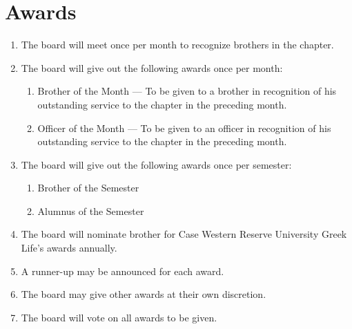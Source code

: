 \section{Awards}
	\begin{enumerate}
		\item The board will meet once per month to recognize brothers in the chapter.
		\item The board will give out the following awards once per month:
			\begin{enumerate}
				\item Brother of the Month --- To be given to a brother in recognition of his outstanding service to the chapter in the preceding month.
				\item Officer of the Month --- To be given to an officer in recognition of his outstanding service to the chapter in the preceding month.
			\end{enumerate}
        \item The board will give out the following awards once per semester:
            \begin{enumerate}
                \item Brother of the Semester
                \item Alumnus of the Semester
            \end{enumerate}
        \item The board will nominate brother for Case Western Reserve University Greek Life's awards annually.
		\item A runner-up may be announced for each award.
		\item The board may give other awards at their own discretion. 
		\item The board will vote on all awards to be given.
	\end{enumerate}
	\pagebreak